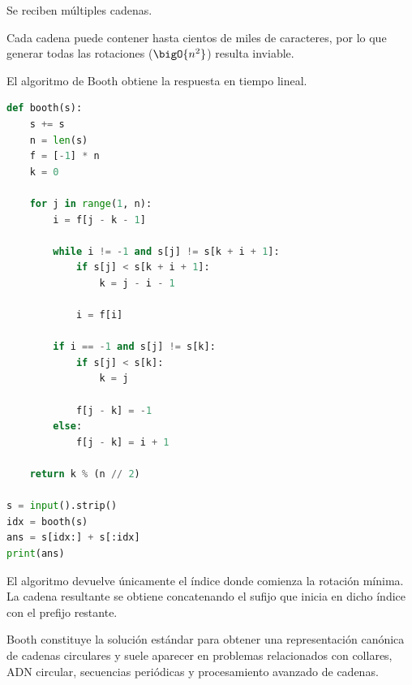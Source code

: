 
Se reciben múltiples cadenas.

Cada cadena puede contener hasta cientos de miles de caracteres, por lo que generar todas las rotaciones (\(\bigO{n^2}\)) resulta inviable.

El algoritmo de Booth obtiene la respuesta en tiempo lineal.


\begin{lstlisting}[language=Python]
def booth(s):
    s += s
    n = len(s)
    f = [-1] * n
    k = 0

    for j in range(1, n):
        i = f[j - k - 1]

        while i != -1 and s[j] != s[k + i + 1]:
            if s[j] < s[k + i + 1]:
                k = j - i - 1

            i = f[i]

        if i == -1 and s[j] != s[k]:
            if s[j] < s[k]:
                k = j

            f[j - k] = -1
        else:
            f[j - k] = i + 1

    return k % (n // 2)

s = input().strip()
idx = booth(s)
ans = s[idx:] + s[:idx]
print(ans)
\end{lstlisting}


El algoritmo devuelve únicamente el índice donde comienza la rotación mínima. La cadena resultante se obtiene concatenando el sufijo que inicia en dicho índice con el prefijo restante.

Booth constituye la solución estándar para obtener una representación canónica de cadenas circulares y suele aparecer en problemas relacionados con collares, ADN circular, secuencias periódicas y procesamiento avanzado de cadenas.